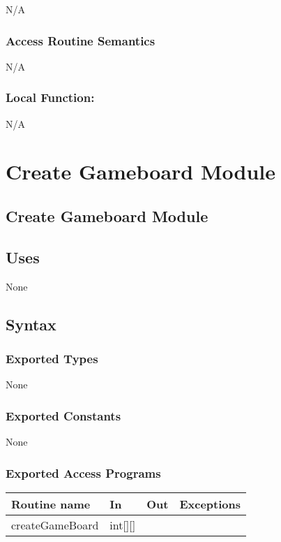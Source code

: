 \documentclass[12pt]{article}
\begin{document}
N/A

\subsubsection* {Access Routine Semantics}

N/A

\subsubsection*{Local Function:}

N/A

\newpage

\section {Create Gameboard Module}

\subsection* {Create Gameboard Module}

\subsection* {Uses}

None

\subsection* {Syntax}

\subsubsection* {Exported Types}

None

\subsubsection* {Exported Constants}

None

\subsubsection* {Exported Access Programs}
\begin{tabular}{| l | l | l | p{6cm} |}
\hline
\textbf{Routine name} & \textbf{In} & \textbf{Out} & \textbf{Exceptions}\\
\hline
createGameBoard & int[][] & ~ &  \\
\hline
\end{tabular}
\end{document}
